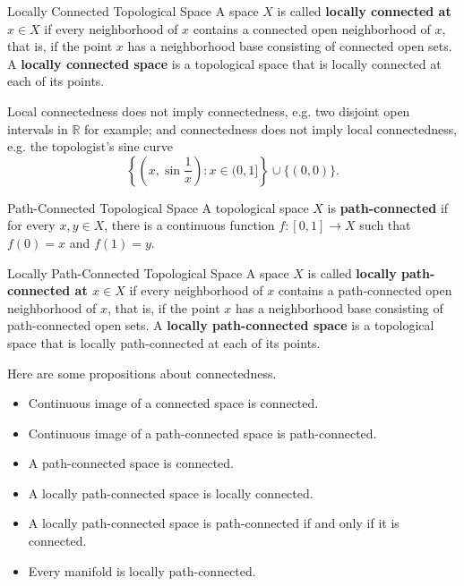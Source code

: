 \documentclass{report}
\begin{document}
\begin{definition}{Locally Connected Topological Space}{}
	A space $X$ is called \textbf{locally connected at $x\in X$} if every neighborhood of $x$ contains a connected open neighborhood of $x$, that is, if the point $x$ has a neighborhood base consisting of connected open sets. A \textbf{locally connected space} is a topological space that is locally connected at each of its points.
\end{definition}

Local connectedness does not imply connectedness, e.g. two disjoint open intervals in $\mathbb {R}$ for example; and connectedness does not imply local connectedness, e.g. the topologist's sine curve $$\left\{\left(x, \sin \frac{1}{x}\right): x \in(0,1]\right\} \cup\{(0,0)\}.$$
\begin{definition}{Path-Connected Topological Space}{}
	A topological space $X$ is \textbf{path-connected} if for every $x,y\in X$, there is a continuous function $f:[0,1]\to X$ such that $f(0)=x$ and $f(1)=y$.
\end{definition}

\begin{definition}{Locally Path-Connected Topological Space}{}
	A space $X$ is called \textbf{locally path-connected at $x\in X$} if every neighborhood of $x$ contains a path-connected open neighborhood of $x$, that is, if the point $x$ has a neighborhood base consisting of path-connected open sets. A \textbf{locally path-connected space} is a topological space that is locally path-connected at each of its points.
\end{definition}


\begin{proposition}{}{}
	Here are some propositions about connectedness.
	\begin{itemize}
		\item Continuous image of a connected space is connected.
		\item Continuous image of a path-connected space is path-connected.
		\item A path-connected space is connected.
		\item A locally path-connected space is locally connected.
		\item A locally path-connected space is path-connected if and only if it is connected.
		\item Every manifold is locally path-connected.
	\end{itemize}

\end{proposition}
\end{document}
